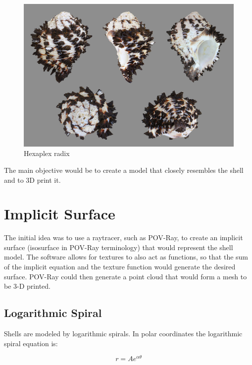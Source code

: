\documentclass[a4paper]{article}
\begin{document}
\begin{figure}[h]
	\centering\includegraphics[scale=0.25]{./img/hexaplex_radix.jpg}
	\caption{Hexaplex radix \cite{wikipedia-hexaplex}}
	\label{fig:hexaplex-radix} %
\end{figure}

The main objective would be to create a model that closely resembles the shell and to 3D print it.

\section{Implicit Surface}

The initial idea was to use a raytracer, such as POV-Ray, to create an implicit surface (isosurface in POV-Ray terminology) that would represent the shell model. The software allows for textures to also act as functions, so that the sum of the implicit equation and the texture function would generate the desired surface. POV-Ray could then generate a point cloud that would form a mesh to be 3-D printed.

\subsection{Logarithmic Spiral}

Shells are modeled by logarithmic spirals. In polar coordinates the logarithmic spiral equation is:

\begin{equation}
	r = Ae^{\alpha \theta}
\end{equation}
\end{document}
